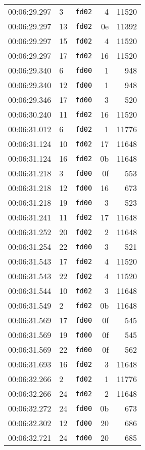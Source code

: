 \documentclass{article}
\begin{document}
\begin{longtable}{lllrr}
00:06:29.297 & 3 & \texttt{fd02} & 4 & 11520 \\
00:06:29.297 & 13 & \texttt{fd02} & 0e & 11392 \\
00:06:29.297 & 15 & \texttt{fd02} & 4 & 11520 \\
00:06:29.297 & 17 & \texttt{fd02} & 16 & 11520 \\
00:06:29.340 & 6 & \texttt{fd00} & 1 & 948 \\
00:06:29.340 & 12 & \texttt{fd00} & 1 & 948 \\
00:06:29.346 & 17 & \texttt{fd00} & 3 & 520 \\
00:06:30.240 & 11 & \texttt{fd02} & 16 & 11520 \\
00:06:31.012 & 6 & \texttt{fd02} & 1 & 11776 \\
00:06:31.124 & 10 & \texttt{fd02} & 17 & 11648 \\
00:06:31.124 & 16 & \texttt{fd02} & 0b & 11648 \\
00:06:31.218 & 3 & \texttt{fd00} & 0f & 553 \\
00:06:31.218 & 12 & \texttt{fd00} & 16 & 673 \\
00:06:31.218 & 19 & \texttt{fd00} & 3 & 523 \\
00:06:31.241 & 11 & \texttt{fd02} & 17 & 11648 \\
00:06:31.252 & 20 & \texttt{fd02} & 2 & 11648 \\
00:06:31.254 & 22 & \texttt{fd00} & 3 & 521 \\
00:06:31.543 & 17 & \texttt{fd02} & 4 & 11520 \\
00:06:31.543 & 22 & \texttt{fd02} & 4 & 11520 \\
00:06:31.544 & 10 & \texttt{fd02} & 3 & 11648 \\
00:06:31.549 & 2 & \texttt{fd02} & 0b & 11648 \\
00:06:31.569 & 17 & \texttt{fd00} & 0f & 545 \\
00:06:31.569 & 19 & \texttt{fd00} & 0f & 545 \\
00:06:31.569 & 22 & \texttt{fd00} & 0f & 562 \\
00:06:31.693 & 16 & \texttt{fd02} & 3 & 11648 \\
00:06:32.266 & 2 & \texttt{fd02} & 1 & 11776 \\
00:06:32.266 & 24 & \texttt{fd02} & 2 & 11648 \\
00:06:32.272 & 24 & \texttt{fd00} & 0b & 673 \\
00:06:32.302 & 12 & \texttt{fd00} & 20 & 686 \\
00:06:32.721 & 24 & \texttt{fd00} & 20 & 685 \\

\end{longtable}
\end{document}
